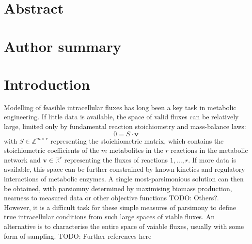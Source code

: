 \documentclass[10pt,letterpaper]{article}
\begin{document}
\section*{Abstract}


\section*{Author summary}


\linenumbers

\section*{Introduction}

Modelling of feasible intracellular fluxes has long been a key task in metabolic engineering.
If little data is available, the space of valid fluxes can be relatively large, limited only by fundamental reaction stoichiometry and mass-balance laws:
\[
    \label{eq:steady_state}
    0 = S\cdot \mathbf{v}
\]
with $S \in \mathbb{Z}^{m\times r}$ representing the stoichiometric matrix, which contains the stoichiometric coefficients of the $m$ metabolites in the $r$ reactions in the metabolic network and $\mathbf{v} \in \mathbb{R}^r$ representing the fluxes of reactions $1,\dots,r$.
If more data is available, this space can be further constrained by known kinetics and regulatory interactions of metabolic enzymes.
A single most-parsimonious solution can then be obtained, with parsiomny determined by maximising biomass production, nearness to measured data or other objective functions {TODO: Others?}.
However, it is a difficult task for these simple measures of parsimony to define true intracellular conditions from such large spaces of viable fluxes.
An alternative is to characterise the entire space of vaiable fluxes, usually with some form of sampling. {TODO: Further references here}
\end{document}
